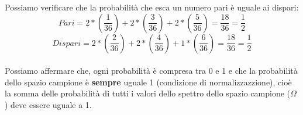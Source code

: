 Possiamo verificare che la probabilità che esca un numero pari è uguale ai dispari:
$$ Pari = 2*(\frac{1}{36}) + 2*(\frac{3}{36}) + 2*(\frac{5}{36}) = \frac{18}{36} = \frac{1}{2}$$
$$ Dispari = 2*(\frac{2}{36}) + 2*(\frac{4}{36}) + 1*(\frac{6}{36}) = \frac{18}{36} = \frac{1}{2}$$\\
Possiamo affermare che, ogni probabilità è compresa tra 0 e 1 e che la
probabilità dello spazio campione è \textbf{sempre} uguale 1 (condizione di normalizzazzione), cioè la somma delle probabilità di tutti i valori dello spettro dello spazio campione ($\Omega$) deve essere uguale a 1.



 





